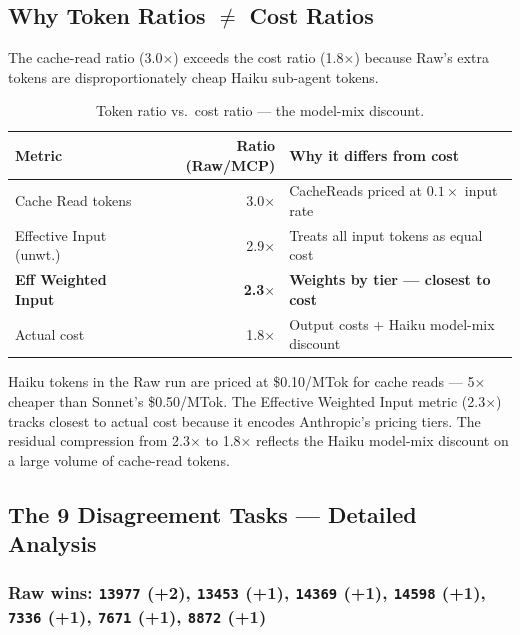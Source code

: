 \subsection{Why Token Ratios $\neq$ Cost Ratios}
\label{sec:token-cost-gap-sonnet}

The cache-read ratio (3.0$\times$) exceeds the cost ratio
(1.8$\times$) because Raw's extra tokens are
disproportionately cheap Haiku sub-agent tokens.

\begin{table}[h]
\centering
\caption{Token ratio vs.\ cost ratio --- the model-mix discount.}\label{tab:ratio-gap-sonnet}
\begin{tabular}{lrl}
\toprule
\textbf{Metric} & \textbf{Ratio (Raw/MCP)} & \textbf{Why it differs from cost} \\
\midrule
Cache Read tokens          & 3.0$\times$ & CacheReads priced at $0.1\times$ input rate \\
Effective Input (unwt.)    & 2.9$\times$ & Treats all input tokens as equal cost \\
\textbf{Eff Weighted Input}& \textbf{2.3$\times$} & \textbf{Weights by tier --- closest to cost} \\
Actual cost                & 1.8$\times$ & Output costs + Haiku model-mix discount \\
\bottomrule
\end{tabular}
\end{table}

\noindent
Haiku tokens in the Raw run are priced at \$0.10/MTok for cache reads ---
5$\times$ cheaper than Sonnet's \$0.50/MTok.
The Effective Weighted Input metric (2.3$\times$) tracks closest to
actual cost because it encodes Anthropic's pricing tiers.
The residual compression from 2.3$\times$ to 1.8$\times$ reflects the
Haiku model-mix discount on a large volume of cache-read tokens.

\subsection{The 9 Disagreement Tasks --- Detailed Analysis}
\label{sec:disagreements-sonnet}

\subsubsection{Raw wins: \texttt{13977} (+2),
               \texttt{13453} (+1), \texttt{14369} (+1),
               \texttt{14598} (+1), \texttt{7336} (+1),
               \texttt{7671} (+1), \texttt{8872} (+1)}

